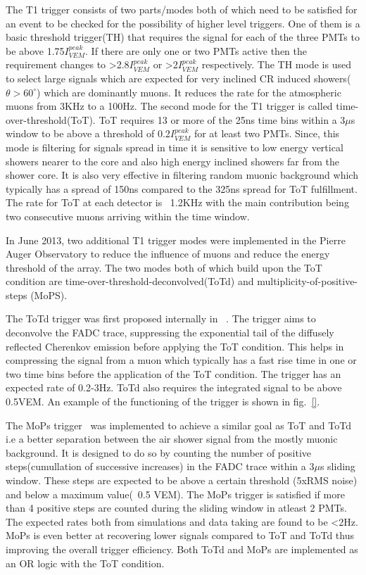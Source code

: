The T1 trigger consists of two parts/modes both of which need to be satisfied for an event to be checked for the possibility of higher level triggers. One of them is a basic threshold trigger(TH) that requires the signal for each of the three PMTs to be above 1.75$I_{VEM}^{peak}$. If there are only one or two PMTs active then the requirement changes to >2.8$I_{VEM}^{peak}$ or >2$I_{VEM}^{peak}$ respectively. The TH mode is used to select large signals which are expected for very inclined CR induced showers($\theta >60^{\circ}$) which are dominantly muons. It reduces the rate for the atmospheric muons from 3KHz to a 100Hz. The second mode for the T1 trigger is called time-over-threshold(ToT). ToT requires 13 or more of the 25ns time bins within a 3$\mu$s window to be above a threshold of 0.2$I_{VEM}^{peak}$ for at least two PMTs. Since, this mode is filtering for signals spread in time it is sensitive to low energy vertical showers nearer to the core and also high energy inclined showers far from the shower core. It is also very effective in filtering random muonic background which typically has a spread of 150ns compared to the 325ns spread for ToT fulfillment. The rate for ToT at each detector is ~1.2KHz with the main contribution being two consecutive muons arriving within the time window. 


In June 2013, two additional T1 trigger modes were implemented in the Pierre Auger Observatory to reduce the influence of muons and reduce the energy threshold of the array. The two modes both of which build upon the ToT condition are time-over-threshold-deconvolved(ToTd) and multiplicity-of-positive-steps (MoPS).

The ToTd trigger was first proposed internally in ~\cite{}. The trigger aims to deconvolve the FADC trace, suppressing the exponential tail of the diffusely reflected Cherenkov emission before applying the ToT condition. This helps in compressing the signal from a muon which typically has a fast rise time in one or two time bins before the application of the ToT condition. The trigger has an expected rate of 0.2-3Hz. ToTd also requires the integrated signal to be above 0.5VEM. An example of the functioning of the trigger is shown in fig.~\ref{}. 

The MoPs trigger~\cite{} was implemented to achieve a similar goal as ToT and ToTd i.e a better separation between the air shower signal from the mostly muonic background. It is designed to do so by counting the number of positive steps(cumullation of successive increases) in the FADC trace within a 3$\mu$s sliding window. These steps are expected to be above a certain threshold (5xRMS noise) and below a maximum value(~0.5 VEM). The MoPs trigger is satisfied if more than 4 positive steps are counted during the sliding window in atleast 2 PMTs. The expected rates both from simulations and data taking are found to be <2Hz. MoPs is even better at recovering lower signals compared to ToT and ToTd thus improving the overall trigger efficiency. Both ToTd and MoPs are implemented as an OR logic with the ToT condition. 

